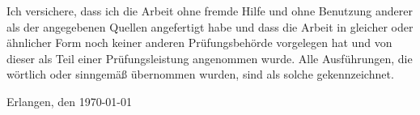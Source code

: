 
\cleardoublepage%
\thispagestyle{empty}

Ich versichere, dass ich die Arbeit ohne fremde Hilfe und ohne Benutzung anderer als der angegebenen Quellen angefertigt
habe und dass die Arbeit in gleicher oder ähnlicher Form noch keiner anderen Prüfungsbehörde vorgelegen hat und von
dieser als Teil einer Prüfungsleistung angenommen wurde. Alle Ausführungen, die wörtlich oder sinngemäß übernommen
wurden, sind als solche gekennzeichnet.

\vspace*{2cm}

Erlangen, den \today
\hspace{1.3cm}

\balanguage%
